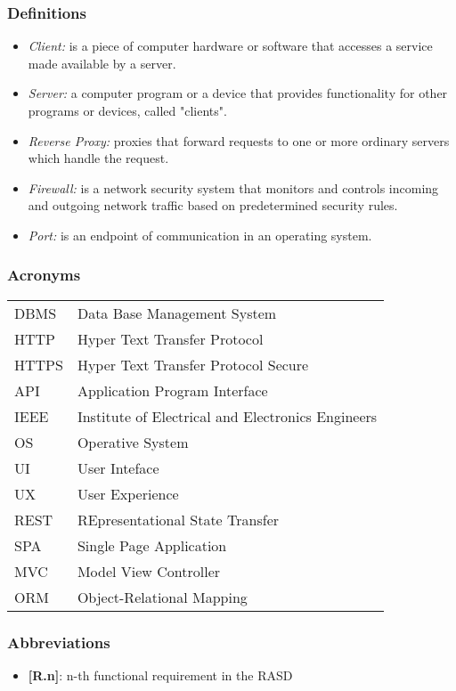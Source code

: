 \subsubsection{Definitions}
\begin{itemize}
	\item \textit{Client:} is a piece of computer hardware or software that accesses a service made available by a server.
	\item \textit{Server:} a computer program or a device that provides functionality for other programs or devices, called "clients".
	\item \textit{Reverse Proxy:} proxies that forward requests to one or more ordinary servers which handle the request.
	\item \textit{Firewall:} is a network security system that monitors and controls incoming and outgoing network traffic based on predetermined security rules.
	\item \textit{Port:} is an endpoint of communication in an operating system.
\end{itemize}

\subsubsection{Acronyms}

\begin{center}
	\begin{tabular}{| l | l |}
		\hline
		DBMS & Data Base Management System\\
		HTTP & Hyper Text Transfer Protocol\\
		HTTPS & Hyper Text Transfer Protocol Secure\\
		API & Application Program Interface \\
		IEEE & Institute of Electrical and Electronics Engineers\\
		OS & Operative System\\
		UI & User Inteface\\
		UX & User Experience\\
		REST & REpresentational State Transfer\\
		SPA & Single Page Application \\
		MVC & Model View Controller\\
		ORM & Object-Relational Mapping\\
		\hline
	\end{tabular}
\end{center}

\subsubsection{Abbreviations}
\begin{itemize}
	\item \textbf{[R.n]}: n-th functional requirement in the RASD
\end{itemize}

